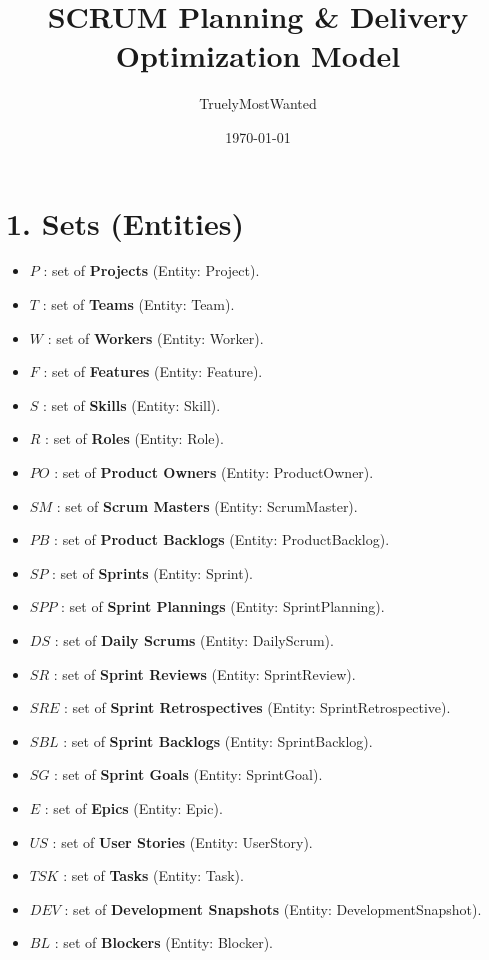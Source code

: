\documentclass[11pt,a4paper]{article}
\title{SCRUM Planning \& Delivery Optimization Model}
\author{TruelyMostWanted}
\date{\today}
\begin{document}
\maketitle
\tableofcontents
\newpage

\section{1. Sets (Entities)}
\begin{itemize}
  \item $P$ : set of \textbf{Projects} (Entity: Project).
  \item $T$ : set of \textbf{Teams} (Entity: Team).
  \item $W$ : set of \textbf{Workers} (Entity: Worker).
  \item $F$ : set of \textbf{Features} (Entity: Feature).
  \item $S$ : set of \textbf{Skills} (Entity: Skill).
  \item $R$ : set of \textbf{Roles} (Entity: Role).
  \item $PO$ : set of \textbf{Product Owners} (Entity: ProductOwner).
  \item $SM$ : set of \textbf{Scrum Masters} (Entity: ScrumMaster).
  \item $PB$ : set of \textbf{Product Backlogs} (Entity: ProductBacklog).
  \item $SP$ : set of \textbf{Sprints} (Entity: Sprint).
  \item $SPP$ : set of \textbf{Sprint Plannings} (Entity: SprintPlanning).
  \item $DS$ : set of \textbf{Daily Scrums} (Entity: DailyScrum).
  \item $SR$ : set of \textbf{Sprint Reviews} (Entity: SprintReview).
  \item $SRE$ : set of \textbf{Sprint Retrospectives} (Entity: SprintRetrospective).
  \item $SBL$ : set of \textbf{Sprint Backlogs} (Entity: SprintBacklog).
  \item $SG$ : set of \textbf{Sprint Goals} (Entity: SprintGoal).
  \item $E$ : set of \textbf{Epics} (Entity: Epic).
  \item $US$ : set of \textbf{User Stories} (Entity: UserStory).
  \item $TSK$ : set of \textbf{Tasks} (Entity: Task).
  \item $DEV$ : set of \textbf{Development Snapshots} (Entity: DevelopmentSnapshot).
  \item $BL$ : set of \textbf{Blockers} (Entity: Blocker).

\end{itemize}
\end{document}
